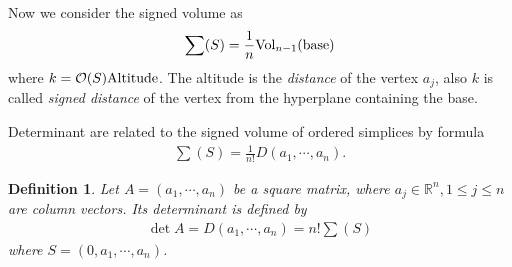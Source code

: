 \documentclass[11pt]{book}
\newtheorem{definition}{Definition}[section]
\theoremstyle{definition}
\numberwithin{equation}{chapter}
\begin{document}
Now we consider the signed volume as
\begin{align*}
    \sum (S) =\frac{1}{n}{\rm Vol}_{n-1}({\rm base})
\end{align*}
where $k = \mathcal{O}(S) {\rm Altitude}$. The altitude is the \emph{distance} of the vertex $a_j$, also $k$ is called \emph{signed distance} of the vertex from the hyperplane containing the base. 

Determinant are related to the signed volume of ordered simplices by formula
\begin{align*}
    \sum (S) = \frac{1}{n!}D(a_1,\cdots,a_n).
\end{align*}

\medskip

\begin{definition}
Let $A = (a_1,\cdots, a_n)$ be a square matrix, where $a_j\in\mathbb{R}^n, 1\leq j\leq n$ are column vectors. Its determinant is defined by 
\begin{align*}
    \det A = D(a_1,\cdots,a_n) = n! \sum (S) 
\end{align*}
where $S = (0,a_1,\cdots,a_n)$.
\end{definition}

\medskip
\end{document}
